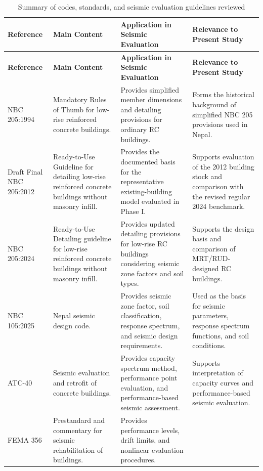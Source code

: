 \begin{longtable}{@{}p{3.25cm}p{3.30cm}p{3.35cm}p{2.90cm}@{}}
\caption[Codes, standards and seismic evaluation guidelines reviewed]{Summary of codes, standards, and seismic evaluation guidelines reviewed}\label{tab:literature_codes_guidelines}\\
\hline\hline
\textbf{Reference} & \textbf{Main Content} & \textbf{Application in Seismic Evaluation} & \textbf{Relevance to Present Study} \\ \hline
\endfirsthead
\hline\hline
\textbf{Reference} & \textbf{Main Content} & \textbf{Application in Seismic Evaluation} & \textbf{Relevance to Present Study} \\ \hline
\endhead
NBC 205:1994 \cite{nbc205_1994}
& Mandatory Rules of Thumb for low-rise reinforced concrete buildings.
& Provides simplified member dimensions and detailing provisions for ordinary RC buildings.
& Forms the historical background of simplified NBC 205 provisions used in Nepal. \\ \hline
Draft Final NBC 205:2012 \cite{nbc205_2012}
& Ready-to-Use Guideline for detailing low-rise reinforced concrete buildings without masonry infill.
& Provides the documented basis for the representative existing-building model evaluated in Phase I.
& Supports evaluation of the 2012 building stock and comparison with the revised regular 2024 benchmark. \\ \hline
NBC 205:2024 \cite{nbc205_2024}
& Ready-to-Use Detailing guideline for low-rise reinforced concrete buildings without masonry infill.
& Provides updated detailing provisions for low-rise RC buildings considering seismic zone factors and soil types.
& Supports the design basis and comparison of MRT/RUD-\allowbreak{}designed RC buildings. \\ \hline
NBC 105:2025 \cite{nbc105_2025}
& Nepal seismic design code.
& Provides seismic zone factor, soil classification, response spectrum, and seismic design requirements.
& Used as the basis for seismic parameters, response spectrum functions, and soil conditions. \\ \hline
ATC-40 \cite{atc1996atc40}
& Seismic evaluation and retrofit of concrete buildings.
& Provides capacity spectrum method, performance point evaluation, and performance-based seismic assessment.
& Supports interpretation of capacity curves and performance-based seismic evaluation. \\ \hline
FEMA 356 \cite{fema2000fema356}
& Prestandard and commentary for seismic rehabilitation of buildings.
& Provides performance levels, drift limits, and nonlinear evaluation procedures.

\end{longtable}
